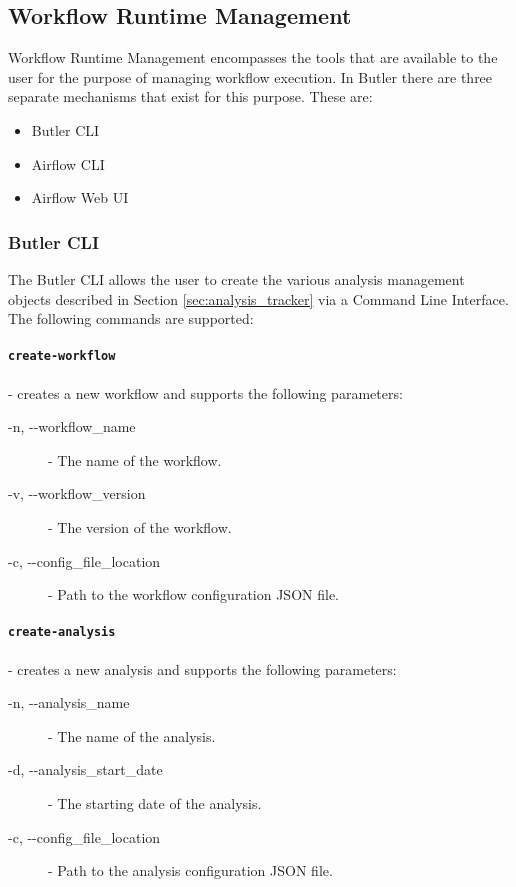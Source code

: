 \subsection{Workflow Runtime Management}

Workflow Runtime Management encompasses the tools that are available to the user for the purpose of managing workflow execution. In Butler there are three separate mechanisms that exist for this purpose. These are:

\begin{itemize}
\item Butler CLI
\item Airflow CLI
\item Airflow Web UI
\end{itemize}

\subsubsection{Butler CLI}

The Butler CLI allows the user to create the various analysis management objects described in Section \ref{sec:analysis_tracker} via a Command Line Interface. The following commands are supported:

\paragraph{\texttt{create-workflow}} - creates a new workflow and supports the following parameters:
\begin{description}
\item [-n, -\--workflow\_name] - The name of the workflow.
\item [-v, -\--workflow\_version] - The version of the workflow.
\item [-c, -\--config\_file\_location] - Path to the workflow configuration JSON file.
\end{description}

\paragraph{\texttt{create-analysis}} - creates a new analysis and supports the following parameters:
\begin{description}
\item [-n, -\--analysis\_name] - The name of the analysis.
\item [-d, -\--analysis\_start\_date] - The starting date of the analysis.
\item [-c, -\--config\_file\_location] - Path to the analysis configuration JSON file.
\end{description}

